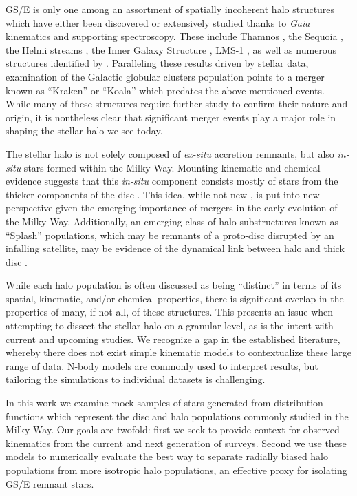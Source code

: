GS/E is only one among an assortment of spatially incoherent halo structures which have either been discovered or extensively studied thanks to \textit{Gaia} kinematics and supporting spectroscopy. These include Thamnos \parencite{koppelman19b}, the Sequoia \parencite{myeong19}, the Helmi streams \parencite{helmi99,koppelman18,koppelman19a}, the Inner Galaxy Structure \parencite[IGS, also known as Heracles;][]{horta21a}, LMS-1 \parencite{yuan20}, as well as numerous structures identified by \textcite{naidu20}. Paralleling these results driven by stellar data, examination of the Galactic globular clusters population points to a merger known as ``Kraken'' \parencite{kruijssen20} or ``Koala'' \parencite{forbes20} which predates the above-mentioned events. While many of these structures require further study to confirm their nature and origin, it is nontheless clear that significant merger events play a major role in shaping the stellar halo we see today.

The stellar halo is not solely composed of \textit{ex-situ} accretion remnants, but also \textit{in-situ} stars formed within the Milky Way. Mounting kinematic and chemical evidence suggests that this \textit{in-situ} component consists mostly of stars from the thicker components of the disc \parencite{helmi18,haywood18,dimatteo19}. This idea, while not new \parencite[e.g.][]{nissen10}, is put into new perspective given the emerging importance of mergers in the early evolution of the Milky Way. Additionally, an emerging class of halo substructures known as ``Splash'' populations, which may be remnants of a proto-disc disrupted by an infalling satellite, may be evidence of the dynamical link between halo and thick disc \parencite{belokurov20,naidu20,lian20}.

While each halo population is often discussed as being ``distinct'' in terms of its spatial, kinematic, and/or chemical properties, there is significant overlap in the properties of many, if not all, of these structures. This presents an issue when attempting to dissect the stellar halo on a granular level, as is the intent with current and upcoming studies. We recognize a gap in the established literature, whereby there does not exist simple kinematic models to contextualize these large range of data. N-body models are commonly used to interpret results, but tailoring the simulations to individual datasets is challenging.

In this work we examine mock samples of stars generated from distribution functions which represent the disc and halo populations commonly studied in the Milky Way. Our goals are twofold: first we seek to provide context for observed kinematics from the current and next generation of surveys. Second we use these models to numerically evaluate the best way to separate radially biased halo populations from more isotropic halo populations, an effective proxy for isolating GS/E remnant stars.

